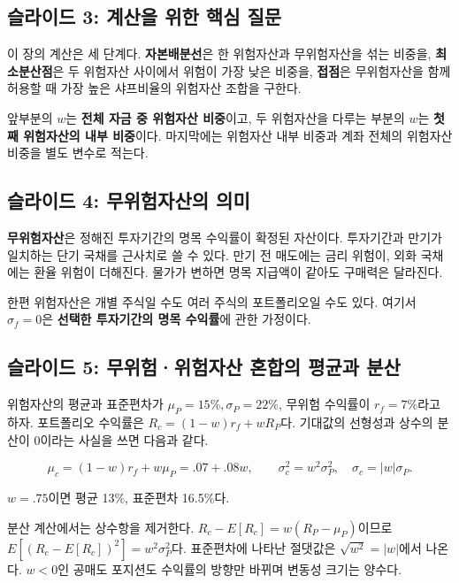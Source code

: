 \documentclass[11pt,a4paper]{article}
\begin{document}
\subsection{슬라이드 3: 계산을 위한 핵심 질문}

이 장의 계산은 세 단계다. \textbf{자본배분선}은 한 위험자산과 무위험자산을 섞는 비중을, \textbf{최소분산점}은 두 위험자산 사이에서 위험이 가장 낮은 비중을, \textbf{접점}은 무위험자산을 함께 허용할 때 가장 높은 샤프비율의 위험자산 조합을 구한다.
\par

앞부분의 $w$는 \textbf{전체 자금 중 위험자산 비중}이고, 두 위험자산을 다루는 부분의 $w$는 \textbf{첫째 위험자산의 내부 비중}이다. 마지막에는 위험자산 내부 비중과 계좌 전체의 위험자산 비중을 별도 변수로 적는다.
\par

\subsection{슬라이드 4: 무위험자산의 의미}

\textbf{무위험자산}은 정해진 투자기간의 명목 수익률이 확정된 자산이다. 투자기간과 만기가 일치하는 단기 국채를 근사치로 쓸 수 있다. 만기 전 매도에는 금리 위험이, 외화 국채에는 환율 위험이 더해진다. 물가가 변하면 명목 지급액이 같아도 구매력은 달라진다.
\par

한편 위험자산은 개별 주식일 수도 여러 주식의 포트폴리오일 수도 있다. 여기서 $\sigma_f=0$은 \textbf{선택한 투자기간의 명목 수익률}에 관한 가정이다.
\par

\subsection{슬라이드 5: 무위험·위험자산 혼합의 평균과 분산}

위험자산의 평균과 표준편차가 $\mu_P=15\%,\sigma_P=22\%$, 무위험 수익률이 $r_f=7\%$라고 하자. 포트폴리오 수익률은 $R_c=(1-w)r_f+wR_P$다. 기대값의 선형성과 상수의 분산이 0이라는 사실을 쓰면 다음과 같다.
\par

\[
\mu_c=(1-w)r_f+w\mu_P=.07+.08w,\qquad
\sigma_c^2=w^2\sigma_P^2,\quad \sigma_c=|w|\sigma_P.
\]

$w=.75$이면 평균 13\%, 표준편차 16.5\%다.
\par

분산 계산에서는 상수항을 제거한다. $R_c-E[R_c]=w(R_P-\mu_P)$이므로 $E[(R_c-E[R_c])^2]=w^2\sigma_P^2$다. 표준편차에 나타난 절댓값은 $\sqrt{w^2}=|w|$에서 나온다. $w<0$인 공매도 포지션도 수익률의 방향만 바뀌며 변동성 크기는 양수다.
\par
\end{document}
